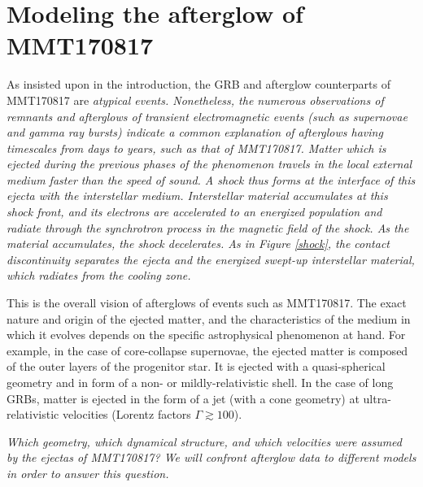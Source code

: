 \part{Modeling the afterglow of MMT170817}

As insisted upon in the introduction, the GRB and afterglow counterparts of MMT170817 are \it{atypical} events. Nonetheless, the numerous observations of remnants and afterglows of transient electromagnetic events (such as supernovae and gamma ray bursts) indicate a common explanation of afterglows having timescales from days to years, such as that of MMT170817. Matter which is ejected during the previous phases of the phenomenon travels in the local external medium faster than the speed of sound. A shock thus forms at the interface of this ejecta with the interstellar medium. Interstellar material accumulates at this shock front, and its electrons are accelerated to an energized population and radiate through the synchrotron process in the magnetic field of the shock. As the material accumulates, the shock decelerates. As in Figure \ref{shock}, the \it{contact discontinuity} separates the ejecta and the energized swept-up interstellar material, which radiates from the \it{cooling zone}.

This is the overall vision of afterglows of events such as MMT170817. The exact nature and origin of the ejected matter, and the characteristics of the medium in which it evolves depends on the specific astrophysical phenomenon at hand. For example, in the case of core-collapse supernovae, the ejected matter is composed of the outer layers of the progenitor star. It is ejected with a quasi-spherical geometry and in form of a non- or mildly-relativistic shell. In the case of long GRBs, matter is ejected in the form of a jet (with a cone geometry) at ultra-relativistic velocities (Lorentz factors $\Gamma \gtrsim 100$).

\it{Which geometry, which dynamical structure, and which velocities were assumed by the ejectas of MMT170817?} We will confront afterglow data to different models in order to answer this question.

